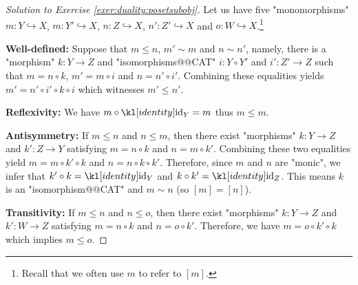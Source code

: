 \documentclass[main.tex]{subfiles}
\begin{document}
\begin{proof}[Solution to Exercise \ref{exer:duality:posetsubobj}]\label{soln:duality:posetsubobj}
    Let us have five "monomorphisms" $m: Y \hookrightarrow X$, $m:Y' \hookrightarrow X$, $n: Z \hookrightarrow X$, $n': Z' \hookrightarrow X$ and $o: W \hookrightarrow X$.\footnote{Recall that we often use $m$ to refer to $[m]$.}

    \textbf{Well-defined:} Suppose that $m \leq n$, $m' \sim m$ and $n\sim n'$, namely, there is a "morphism" $k: Y \rightarrow Z$ and "isomorphisms@@CAT" $i: Y \circ Y'$ and $i': Z' \rightarrow Z$ such that $m = n \circ k$, $m' = m \circ i$ and $n = n' \circ i'$. Combining these equalities yields $m' = n' \circ i' \circ  k \circ i$ which witnesses $m' \leq n'$.

    \textbf{Reflexivity:} We have $m \circ \id_Y = m$ thus $m \leq m$.

    \textbf{Antisymmetry:} If $m\leq n$ and $n\leq m$, then there exist "morphisms" $k: Y \rightarrow Z$ and $k': Z \rightarrow Y$ satisfying $m = n \circ k$ and $n = m \circ k'$. Combining these two equalities yield $m = m \circ k' \circ k$ and $n = n \circ k \circ k'$. Therefore, since $m$ and $n$ are "monic", we infer that $k' \circ k = \id_Y$ and $k \circ k' = \id_Z$. This means $k$ is an "isomorphism@@CAT" and $m \sim n$ (so $[m] = [n]$).

    \textbf{Transitivity:} If $m\leq n$ and $n\leq o$, then there exist "morphisms" $k: Y \rightarrow Z$ and $k': W \rightarrow Z$ satisfying $m = n \circ k$ and $n = o \circ k'$. Therefore, we have $m =  o \circ k' \circ k$ which implies $m \leq o$.
\end{proof}
\end{document}
